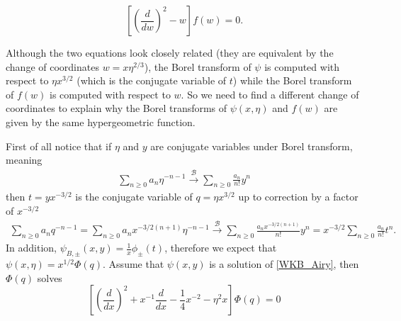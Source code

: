 \documentclass{article}
\theoremstyle{definition}
\theoremstyle{plain}
\begin{document}
\begin{equation}
\label{Airy}
\left[\left(\frac{d}{dw}\right)^2 -  w \right] f(w) = 0.
\end{equation}

Although the two equations look closely related (they are equivalent by the change of coordinates $w=x\eta^{2/3}$), the Borel transform of $\psi$ is computed with respect to $\eta x^{3/2}$ (which is the conjugate variable of $t$) while the Borel transform of $f(w)$ is computed with respect to $w$. So we need to find a different change of coordinates to explain why the Borel transforms of $\psi(x,\eta)$ and $f(w)$ are given by the same hypergeometric function. 

First of all notice that if $\eta$ and $y$ are conjugate variables under Borel transform, meaning 
\begin{align*}
\sum_{n\geq 0}a_n\eta^{-n-1}  \overset{\mathcal{B}}{\longrightarrow} \sum_{n\geq 0}\frac{a_n}{n!} y^{n} 
\end{align*} 
then $t=yx^{-3/2}$ is the conjugate variable of $q=\eta x^{3/2}$ up to correction by a factor of $x^{-3/2}$
\begin{align*}
\sum_{n\geq 0}a_nq^{-n-1}=\sum_{n\geq 0}a_nx^{-3/2(n+1)}\eta^{-n-1}  \overset{\mathcal{B}}{\longrightarrow} \sum_{n\geq 0}\frac{a_nx^{-3/2(n+1)}}{n!} y^{n}=x^{-3/2}\sum_{n\geq 0}\frac{a_n}{n!} t^{n}. 
\end{align*}
In addition, $\psi_{B,\pm}(x,y)=\frac{1}{x}\phi_{\pm}(t)$, therefore we expect that $\psi(x,\eta)=x^{1/2}\Phi(q)$. Assume that $\psi(x,y)$ is a solution of \eqref{WKB_Airy}, then $\Phi(q)$ solves 
\begin{equation}
\label{eq_Phi}
\left[\left(\frac{d}{dx}\right)^2+x^{-1}\frac{d}{dx}-\frac{1}{4}x^{-2} - \eta^2 x \right] \Phi(q) = 0
\end{equation}
\end{document}
